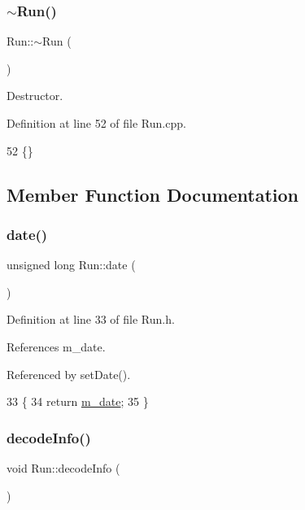 \subsubsection{\texorpdfstring{$\sim$\+Run()}{~Run()}}
{\footnotesize\ttfamily Run\+::$\sim$\+Run (\begin{DoxyParamCaption}{ }\end{DoxyParamCaption})\hspace{0.3cm}{\ttfamily [virtual]}}



Destructor. 



Definition at line 52 of file Run.\+cpp.


\begin{DoxyCode}
52 \{\}
\end{DoxyCode}


\subsection{Member Function Documentation}
\mbox{\label{classRun_ae5f87d35674ded8f7a0d0ca3d842a7b4}} 
\subsubsection{\texorpdfstring{date()}{date()}}
{\footnotesize\ttfamily unsigned long Run\+::date (\begin{DoxyParamCaption}{ }\end{DoxyParamCaption})\hspace{0.3cm}{\ttfamily [inline]}}



Definition at line 33 of file Run.\+h.



References m\+\_\+date.



Referenced by set\+Date().


\begin{DoxyCode}
33                       \{
34     \textcolor{keywordflow}{return} \hyperlink{classRun_a841000f96566fdbe5772f16ef3963006}{m\_date};
35   \}  
\end{DoxyCode}
\mbox{\label{classRun_a2b2687a21cbe4b0b528bdb802a0ee585}} 
\subsubsection{\texorpdfstring{decode\+Info()}{decodeInfo()}}
{\footnotesize\ttfamily void Run\+::decode\+Info (\begin{DoxyParamCaption}{ }\end{DoxyParamCaption})}



